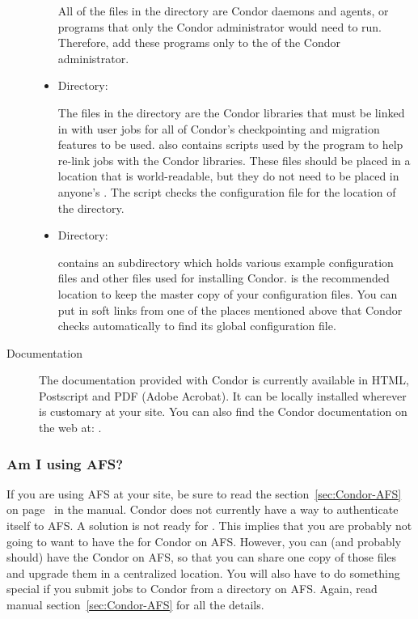 \begin{description}
\begin{itemize}
     All of the files in the  directory are Condor daemons and
     agents, or programs that only the Condor administrator would need
     to run.  Therefore, add these programs only
     to the  of the Condor administrator.

     \item {} Directory:

     The files in the  directory are the Condor libraries that
     must be linked in with user jobs for all of Condor's
     checkpointing and migration features to be used.   also
     contains scripts used by the  program to help
     re-link jobs with the Condor libraries.  These files should be
     placed in a location that is world-readable, but they do not need
     to be placed in anyone's .  The  script checks
     the configuration file for the location of the  directory.

     \item {} Directory:

      contains an  subdirectory which holds various
     example configuration files and other files used for installing Condor.
      is the recommended location to keep the master copy of your
     configuration files.  You can put in soft links from one of the places
     mentioned above that Condor checks automatically to find its
     global configuration file. 
\end{itemize}

\item[Documentation]

The documentation provided with Condor is currently available in
     HTML, Postscript and PDF (Adobe Acrobat).  It can be locally installed
     wherever is customary at your site.  You can also find the Condor
     documentation on the web at:
     .

\end{description}

\subsubsection{Am I using AFS?}

If you are using AFS at your site, be sure to read the
section~\ref{sec:Condor-AFS} on page~\pageref{sec:Condor-AFS} in the
manual.
Condor does not currently have a way to authenticate itself to AFS.
A solution is not ready for
\VersionNotice{}.
This implies that you are probably not going to want
to have the  for Condor on AFS.
However, you can
(and probably should) have the Condor  on AFS, so
that you can share one copy of those files and upgrade them in a
centralized location.  You will also have to do something special if
you submit jobs to Condor from a directory on AFS.  Again, read manual
section~\ref{sec:Condor-AFS} for all the details.

